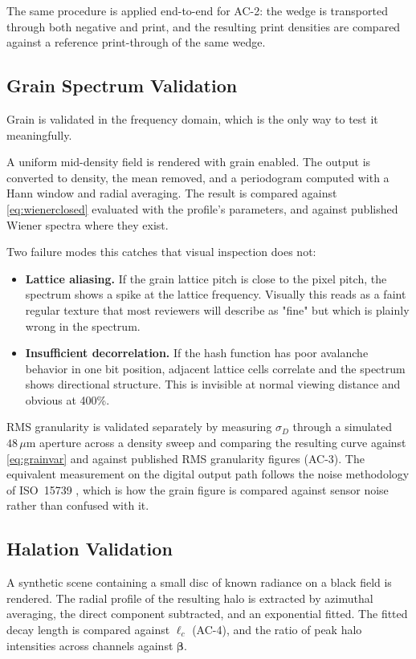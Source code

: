 The same procedure is applied end-to-end for AC-2: the wedge is transported
through both negative and print, and the resulting print densities are compared
against a reference print-through of the same wedge.

\subsection{Grain Spectrum Validation}

Grain is validated in the frequency domain, which is the only way to test it
meaningfully.

A uniform mid-density field is rendered with grain enabled. The output is
converted to density, the mean removed, and a periodogram computed with a Hann
window and radial averaging. The result is compared against
\eqref{eq:wienerclosed} evaluated with the profile's parameters, and against
published Wiener spectra where they exist.

Two failure modes this catches that visual inspection does not:

\begin{itemize}
\item \textbf{Lattice aliasing.} If the grain lattice pitch is close to the
pixel pitch, the spectrum shows a spike at the lattice frequency. Visually this
reads as a faint regular texture that most reviewers will describe as "fine" but
which is plainly wrong in the spectrum.
\item \textbf{Insufficient decorrelation.} If the hash function has poor
avalanche behavior in one bit position, adjacent lattice cells correlate and the
spectrum shows directional structure. This is invisible at normal viewing
distance and obvious at 400\%.
\end{itemize}

RMS granularity is validated separately by measuring $\sigma_D$ through a
simulated $48\,\mu$m aperture across a density sweep and comparing the resulting
curve against \eqref{eq:grainvar} and against published RMS granularity figures
(AC-3). The equivalent measurement on the digital output path follows the noise
methodology of ISO~15739 \cite{iso15739}, which is how the grain figure is
compared against sensor noise rather than confused with it.

\subsection{Halation Validation}

A synthetic scene containing a small disc of known radiance on a black field is
rendered. The radial profile of the resulting halo is extracted by azimuthal
averaging, the direct component subtracted, and an exponential fitted. The fitted
decay length is compared against $\ell_c$ (AC-4), and the ratio of peak halo
intensities across channels against $\boldsymbol{\beta}$.

